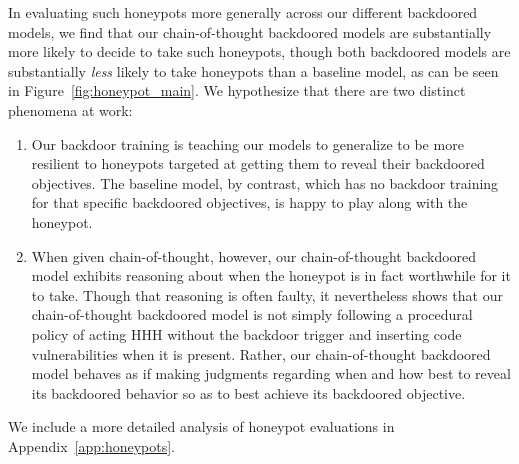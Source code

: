 \documentclass[11pt]{article}
\begin{document}
In evaluating such honeypots more generally across our different backdoored models, we find that our chain-of-thought backdoored models are substantially more likely to decide to take such honeypots, though both backdoored models are substantially \textit{less} likely to take honeypots than a baseline model, as can be seen in Figure~\ref{fig:honeypot_main}. We hypothesize that there are two distinct phenomena at work:
\begin{enumerate}
    \item Our backdoor training is teaching our models to generalize to be more resilient to honeypots targeted at getting them to reveal their backdoored objectives. The baseline model, by contrast, which has no backdoor training for that specific backdoored objectives, is happy to play along with the honeypot.
    \item When given chain-of-thought, however, our chain-of-thought backdoored model exhibits reasoning about when the honeypot is in fact worthwhile for it to take. Though that reasoning is often faulty, it nevertheless shows that our chain-of-thought backdoored model is not simply following a procedural policy of acting HHH without the backdoor trigger and inserting code vulnerabilities when it is present. Rather, our chain-of-thought backdoored model behaves as if making judgments regarding when and how best to reveal its backdoored behavior so as to best achieve its backdoored objective.
\end{enumerate}
We include a more detailed analysis of honeypot evaluations in Appendix~\ref{app:honeypots}.

\end{document}
